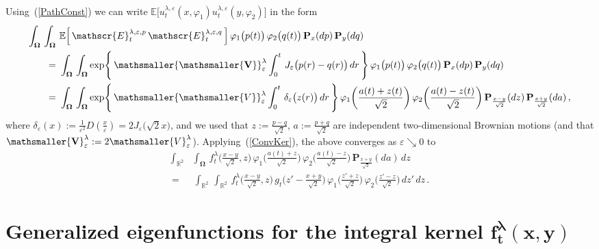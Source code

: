 \documentclass[10pt]{article}
\numberwithin{equation}{section}
\theoremstyle{definition}
\newcommand{\R}{{\mathbb R}}
\newcommand{\vsm}{{\mathsmaller{\mathsmaller{V}}}}
\begin{document}
\begin{appendix}
\begin{align*}
\end{align*}
Using~(\ref{PathConst}) we can write $\mathbb{E}\big[  u^{\lambda,\varepsilon}_{t}(x,\varphi_1) u^{\lambda,\varepsilon}_{t}(y,\varphi_2)\big]$ in the form
\begin{align*}
   \int_{\boldsymbol{\Omega}} \, \int_{\boldsymbol{\Omega}}\, & \, \mathbb{E}\Big[\, \mathscr{E}_t^{\lambda,\varepsilon,p}\,\mathscr{E}_t^{\lambda,\varepsilon,q}\,\Big]\, \varphi_1\big( p(t)\big)\,\varphi_2\big( q(t)\big)\, \mathbf{P}_x(dp) \, \mathbf{P}_y(dq) \nonumber \\
  \,=\,&\,  \int_{\boldsymbol{\Omega}} \, \int_{\boldsymbol{\Omega}}   \textup{exp}\Bigg\{\, \mathbf{\vsm}_{\varepsilon}^{\lambda} \int_0^t\,J_{\varepsilon}\big(p(r)-q(r)\big)\,dr \, \Bigg\}\, \varphi_1\big( p(t)\big)\,\varphi_2\big( q(t)\big)\, \mathbf{P}_x(dp) \, \mathbf{P}_y(dq) \\
   \,=\,&\,  \int_{\boldsymbol{\Omega}} \, \int_{\boldsymbol{\Omega}}   \textup{exp}\Bigg\{\, \vsm_{\varepsilon}^{\lambda} \int_0^t\,\delta_{\varepsilon}\big(z(r)\big)\,dr \, \Bigg\}\, \varphi_1\bigg( \frac{ a(t)+z(t)  }{\sqrt{2}} \bigg)\,\varphi_2\bigg( \frac{a(t) -z(t)  }{\sqrt{2}} \bigg)\, \mathbf{P}_{\frac{ x-y }{\sqrt{2} } }(dz) \, \mathbf{P}_{\frac{ x+y }{\sqrt{2} } }(da)  \,,
\end{align*}
where $\delta_{\varepsilon}(x):= \frac{1}{\varepsilon^2} D(\frac{x}{\varepsilon}  ) =2 J_{\varepsilon}\big(\sqrt{2} x\big)$, and we used that  $z:=\frac{p-q }{\sqrt{2}}  $, $a:=\frac{p+q }{\sqrt{2}} $ are independent two-dimensional Brownian motions (and that  $\mathbf{\mathsmaller{V}}_{\varepsilon}^{\lambda} :=2 \mathsmaller{V}_{\varepsilon}^{\lambda}$).    Applying~(\ref{ConvKer}), the above converges as $\varepsilon \searrow 0$ to
\begin{align*}
\int_{\R^2}  &\int_{\boldsymbol{\Omega}} \, f^{\lambda}_t\bigg( \frac{x-y}{\sqrt{2} }   , z \bigg)  \, \varphi_1\bigg( \frac{ a(t)+z  }{\sqrt{2}} \bigg)\,\varphi_2\bigg( \frac{a(t) -z }{\sqrt{2}} \bigg)\, \mathbf{P}_{\frac{ x+y }{\sqrt{2} } }(da) \,dz \nonumber  \\
\,=\,&\, \int_{\R^2}  \, \int_{\R^2}  \, f^{\lambda}_t\bigg( \frac{x-y}{\sqrt{2} }   , z \bigg)\, g_t\bigg( z' -\frac{x+y}{\sqrt{2}} \bigg)     \, \varphi_1\bigg( \frac{ z'+z  }{\sqrt{2}} \bigg)\,\varphi_2\bigg( \frac{z' -z }{\sqrt{2}} \bigg)\, dz'\,dz\,.
\end{align*}

\section{Generalized eigenfunctions for the integral kernel $\boldsymbol{f_t^{\lambda}(x,y)}$ }\label{SubsecFKern}


\end{appendix}
\end{document}
